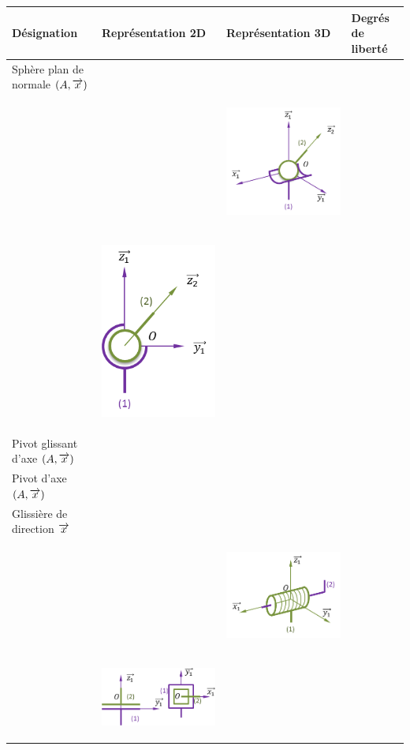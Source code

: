 \documentclass[10pt]{article}
\begin{document}
\begin{center}
\begin{longtable}{|p{}|p{}|p{}|p{}|}
\hline
Désignation & Représentation 2D & Représentation 3D & Degrés de liberté \\
\hline\hline
\endhead
Sphère plan de normale $(A,\overrightarrow{x})$ & \vspace{4cm}& & \\ \hline
& & \begin{center} \includegraphics[width=.17\textwidth]{images/annulaire_3d}\end{center} & \\ \hline
&\begin{center} \includegraphics[width=.12\textwidth]{images/rotule_2d}\end{center} &  & \\ \hline
Pivot glissant d'axe $(A,\overrightarrow{x})$ & \vspace{3cm}& & \\ \hline
Pivot d'axe $(A,\overrightarrow{x})$ & \vspace{3cm}& & \\ \hline
Glissière de direction $\overrightarrow{x}$ & \vspace{3cm}& & \\ \hline
& & \begin{center} \includegraphics[width=.17\textwidth]{images/helico_3d}\end{center} & \\ \hline
&\begin{center} \includegraphics[width=.17\textwidth]{images/plan_2d}\end{center} &  & \\ \hline

\end{longtable}
\end{center}
\end{document}
